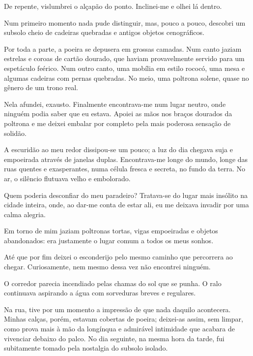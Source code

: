 De repente, vislumbrei o alçapão do ponto. Inclinei-me e olhei lá dentro.

Num primeiro momento nada pude distinguir, mas, pouco a pouco, descobri um
subsolo cheio de cadeiras quebradas e antigos objetos cenográficos.


Por toda a parte, a poeira se depusera em grossas camadas. Num canto jaziam
estrelas e coroas de cartão dourado, que haviam provavelmente servido para um
espetáculo feérico. Num outro canto, uma mobília em estilo rococó, uma mesa e
algumas cadeiras com pernas quebradas. No meio, uma poltrona solene, quase no
gênero de um trono real.

Nela afundei, exausto. Finalmente encontrava-me num lugar neutro, onde ninguém
podia saber que eu estava. Apoiei as mãos nos braços dourados da poltrona e
me deixei embalar por completo pela mais poderosa sensação de solidão.

A escuridão ao meu redor dissipou-se um pouco; a luz do dia chegava suja e
empoeirada através de janelas duplas. Encontrava-me longe do mundo, longe das
ruas quentes e exasperantes, numa célula fresca e secreta, no fundo da terra.
No ar, o silêncio flutuava velho e embolorado.

Quem poderia desconfiar do meu paradeiro? Tratava-se do lugar mais insólito na
cidade inteira, onde, ao dar-me conta de estar ali, eu me deixava invadir por
uma calma alegria.

Em torno de mim jaziam poltronas tortas, vigas empoeiradas e objetos
abandonados: era justamente o lugar comum a todos os meus sonhos. 


Até que por fim deixei o esconderijo pelo mesmo caminho que percorrera ao
chegar. Curiosamente, nem mesmo dessa vez não encontrei ninguém.

O corredor parecia incendiado pelas chamas do sol que se punha. O ralo
continuava aspirando a água com sorveduras breves e regulares.

Na rua, tive por um momento a impressão de que nada daquilo acontecera. Minhas
calças, porém, estavam cobertas de poeira; deixei-as assim, sem limpar, como
prova mais à mão da longínqua e admirável intimidade que acabara de vivenciar
debaixo do palco. No dia seguinte, na mesma hora da tarde, fui subitamente
tomado pela nostalgia do subsolo isolado.

